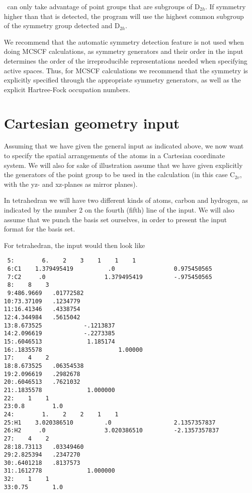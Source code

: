 \siraba\ can only take advantage of point groups that are subgroups
of D$_{2h}$. If symmetry higher than that is detected, the program
will use the highest common subgroup of  the symmetry group
detected and D$_{2h}$. 

We recommend that the automatic symmetry detection feature is not used
when doing MCSCF calculations, as symmetry
generators and their order 
in the input determines the order of the irreproducible representations
needed when specifying active spaces. Thus, for MCSCF
calculations we recommend that the symmetry is  explicitly specified
through the appropriate symmetry generators, as well as the explicit
Hartree-Fock occupation numbers. 

\section{Cartesian geometry input}\label{sec:molcart}

Assuming that we have given the general input as indicated above, we
now want to specify the spatial arrangements of the atoms in a
Cartesian coordinate system. We will also for sake of illustration
assume that we have given explicitly the generators of the point group
to be used in the calculation (in this case C$_{2v}$, with the yz- and
xz-planes as mirror planes).

In tetrahedran we will have two different kinds of atoms, carbon and
hydrogen, as indicated by the number 2 on the fourth (fifth) line of
the input. We will also assume that we punch the basis set ourselves,
in order to present the input format for the basis set.

For tetrahedran, the input would then look like
\begin{verbatim}
 5:        6.    2    3    1    1    1
 6:C1    1.379495419          .0                 0.975450565  
 7:C2     .0                 1.379495419         -.975450565  
 8:    8    3
 9:486.9669   .01772582
10:73.37109   .1234779
11:16.41346   .4338754
12:4.344984   .5615042
13:8.673525            -.1213837
14:2.096619            -.2273385
15:.6046513             1.185174
16:.1835578                      1.00000
17:    4    2
18:8.673525   .06354538
19:2.096619   .2982678
20:.6046513   .7621032
21:.1835578             1.000000
22:    1    1
23:0.8        1.0
24:        1.    2    2    1    1
25:H1    3.020386510         .0                  2.1357357837 
26:H2     .0                 3.020386510         -2.1357357837
27:    4    2
28:18.73113   .03349460
29:2.825394   .2347270
30:.6401218   .8137573
31:.1612778             1.000000
32:    1    1
33:0.75       1.0
\end{verbatim}

